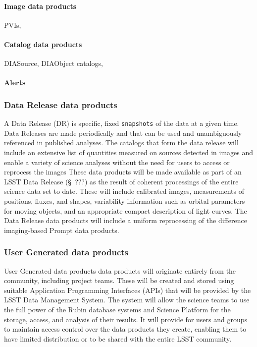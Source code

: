 \paragraph {Image data products}  PVIs,
\paragraph {Catalog data products}  DIASource, DIAObject catalogs,
\paragraph {Alerts}


\subsubsection{Data Release data products} \label{sec:dp-release}
A Data Release (DR) is specific, fixed {\tt snapshots} of the data at a given time.
Data Releases are made periodically and that can be used and
unambiguously referenced in published analyses.
The catalogs that form the data release will include an extensive list of quantities measured on sources detected in images and
enable a variety of science analyses without the need for users to access or reprocess the images
These data products will be made available as part of an LSST Data Release (\S~???) as the result of coherent
processings of the entire science data set to date.
These will include calibrated images, measurements of positions, fluxes, and shapes,  variability information such as orbital
parameters for moving objects, and an appropriate compact description of light curves.
The Data Release data products will include a uniform reprocessing of the difference imaging-based Prompt data products.


\subsubsection{User Generated data products} \label{sec:dp-user}
User Generated data products data products will originate entirely from the community, including project teams.
These will be created and stored using suitable Application Programming Interfaces (APIs)
that will be provided by the LSST Data Management System.
The system will allow the science teams to use the full power of the Rubin database systems and
Science Platform for the storage, access, and analysis of their results.
It will provide for users and groups to maintain access control over the data products they create,
enabling them to have limited distribution or to be shared with the entire LSST community.

